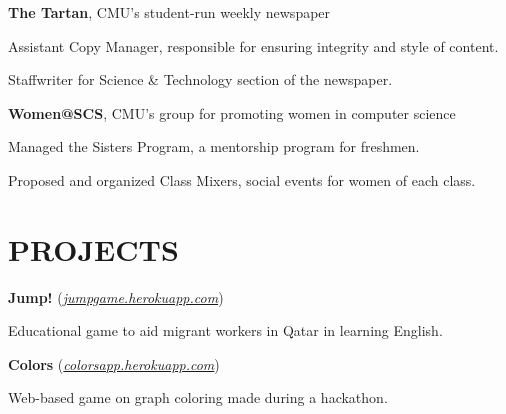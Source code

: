 \documentclass[margin, 11pt]{res} %
\begin{document}
\begin{resume}
{\bf The Tartan}, CMU's student-run weekly newspaper

\begin{itemize} \itemsep -2pt
{\small \item Assistant Copy Manager, responsible for ensuring integrity and style of content.
\item Staffwriter for Science \& Technology section of the newspaper.}
\end{itemize}

\vspace{3pt}

{\bf Women@SCS}, CMU's group for promoting women in computer science

\begin{itemize} \itemsep -2pt
{\small \item Managed the Sisters Program, a mentorship program for freshmen.
\item Proposed and organized Class Mixers, social events for women of each class.}
\end{itemize}



\section{PROJECTS}

{\bf Jump!} (\href{http://jumpgame.herokuapp.com/}{\sl jumpgame.herokuapp.com})

\begin{itemize} \itemsep -2pt
{\small \item Educational game to aid migrant workers in Qatar in learning English.}
\end{itemize}

\vspace{3pt}

{\bf Colors} (\href{http://colorsapp.herokuapp.com}{\sl colorsapp.herokuapp.com})
\begin{itemize} \itemsep -2pt
{\small \item Web-based game on graph coloring made during a hackathon.}
\end{itemize}


\end{resume}
\end{document}
